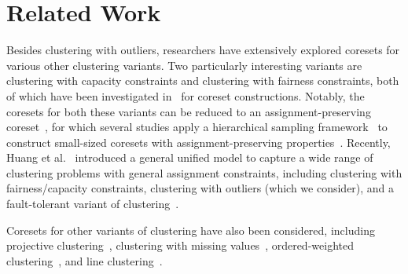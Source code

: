\section{Related Work}
\label{sec:related}
Besides clustering with outliers, researchers have extensively explored coresets for various other clustering variants. 
Two particularly interesting variants are clustering with capacity constraints
and clustering with fairness constraints, both of which have been investigated in~\cite{DBLP:conf/nips/Chierichetti0LV17, DBLP:conf/waoa/0001SS19, DBLP:conf/nips/HuangJV19,Cohen-Addad2019Fixed-Parameter,DBLP:conf/icalp/BandyapadhyayFS21, Braverman22Power} for coreset constructions.
Notably, the coresets for both these variants can be reduced to an assignment-preserving coreset~\cite{DBLP:conf/waoa/0001SS19, DBLP:conf/nips/HuangJV19}, for which several studies apply a hierarchical sampling framework~\cite{Chen09OnCoresets} to construct small-sized coresets with assignment-preserving properties~\cite{DBLP:conf/icalp/BandyapadhyayFS21, Braverman22Power}. Recently, Huang et al.~\cite{Huang2023General} introduced a general unified model to capture a wide range of clustering problems with general assignment constraints, including clustering with fairness/capacity constraints, clustering with outliers (which we consider), and a fault-tolerant variant of clustering~\cite{DBLP:journals/tcs/KhullerPS00}.


Coresets for other variants of clustering have also been considered, including projective clustering~\cite{Feldman11unified,FeldmanSS20Turning,DBLP:conf/aistats/Tukan0ZBF22}, clustering with missing values~\cite{DBLP:conf/nips/BravermanJKW21}, ordered-weighted clustering~\cite{DBLP:conf/icml/BravermanJKW19}, and line clustering~\cite{DBLP:conf/nips/MaromF19, DBLP:conf/nips/LotanSF22}.